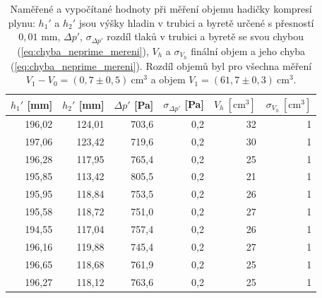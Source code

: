 \documentclass[english]{article}
\newcommand{\unit}[1]{\mathrm{#1}}
\begin{document}
\begin{table}[htbp]
  \centering
    \begin{tabular}{|r|r|r|r|r|r|}
    \hline
    $h_1'$ [mm] & $h_2'$ [mm] & $\Delta p'$ [Pa] & $\sigma_{\Delta p'}$ [Pa] & $V_h\unit{\ [cm^3]}$ & $\sigma_{V_h}\unit{\ [cm^3]}$ \bigstrut\\
    \hline
    196,02 & 124,01 & 703,6 & 0,2   & 32    & 1 \bigstrut\\
    \hline
    197,06 & 123,42 & 719,6 & 0,2   & 30    & 1 \bigstrut\\
    \hline
    196,28 & 117,95 & 765,4 & 0,2   & 25    & 1 \bigstrut\\
    \hline
    195,85 & 113,42 & 805,5 & 0,2   & 21    & 1 \bigstrut\\
    \hline
    195,95 & 118,84 & 753,5 & 0,2   & 26    & 1 \bigstrut\\
    \hline
    195,58 & 118,72 & 751,0 & 0,2   & 27    & 1 \bigstrut\\
    \hline
    194,55 & 117,04 & 757,4 & 0,2   & 26    & 1 \bigstrut\\
    \hline
    196,16 & 119,88 & 745,4 & 0,2   & 27    & 1 \bigstrut\\
    \hline
    196,65 & 118,68 & 761,9 & 0,2   & 25    & 1 \bigstrut\\
    \hline
    196,27 & 118,12 & 763,6 & 0,2   & 25    & 1 \bigstrut\\
    \hline
    \end{tabular}%


\caption{Naměřené a vypočítané hodnoty při měření objemu hadičky kompresí plynu: $h_1'$ a $h_2'$ jsou výšky hladin v trubici a byretě určené s přesností $0,01$ mm, $\Delta p'$, $\sigma_{\Delta p'}$ rozdíl tlaků v trubici a byretě se svou chybou (\ref{eq:chyba_neprime_mereni}), $V_{h}$ a $\sigma_{V_{h}}$ finální objem a jeho chyba (\ref{eq:chyba_neprime_mereni}). Rozdíl objemů byl pro všechna měření $V_1-V_0 = (0,7\pm0,5)\unit{\ cm^3}$ a objem $V_1 = (61,7\pm0,3)\unit{\ cm^3}.$} 

 \label{tab:komprese_2}%
\end{table}%
\end{document}
